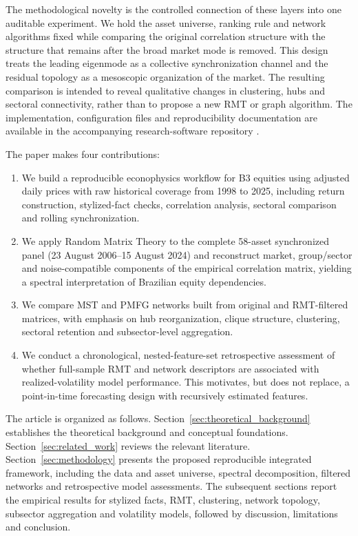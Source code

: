 The methodological novelty is the controlled connection of these layers into one auditable experiment. We hold the asset universe, ranking rule and network algorithms fixed while comparing the original correlation structure with the structure that remains after the broad market mode is removed. This design treats the leading eigenmode as a collective synchronization channel and the residual topology as a mesoscopic organization of the market. The resulting comparison is intended to reveal qualitative changes in clustering, hubs and sectoral connectivity, rather than to propose a new RMT or graph algorithm. The implementation, configuration files and reproducibility documentation are available in the accompanying research-software repository \cite{rmt_planar_networks_2026}.


The paper makes four contributions:
\begin{enumerate}
  \item We build a reproducible econophysics workflow for B3 equities using adjusted daily prices with raw historical coverage from 1998 to 2025, including return construction, stylized-fact checks, correlation analysis, sectoral comparison and rolling synchronization.
  \item We apply Random Matrix Theory to the complete 58-asset synchronized panel (23 August 2006--15 August 2024) and reconstruct market, group/sector and noise-compatible components of the empirical correlation matrix, yielding a spectral interpretation of Brazilian equity dependencies.
  \item We compare MST and PMFG networks built from original and RMT-filtered matrices, with emphasis on hub reorganization, clique structure, clustering, sectoral retention and subsector-level aggregation.
  \item We conduct a chronological, nested-feature-set retrospective assessment of whether full-sample RMT and network descriptors are associated with realized-volatility model performance. This motivates, but does not replace, a point-in-time forecasting design with recursively estimated features.
\end{enumerate}

The article is organized as follows. Section~\ref{sec:theoretical_background} establishes the theoretical background and conceptual foundations. Section~\ref{sec:related_work} reviews the relevant literature. Section~\ref{sec:methodology} presents the proposed reproducible integrated framework, including the data and asset universe, spectral decomposition, filtered networks and retrospective model assessments. The subsequent sections report the empirical results for stylized facts, RMT, clustering, network topology, subsector aggregation and volatility models, followed by discussion, limitations and conclusion.
